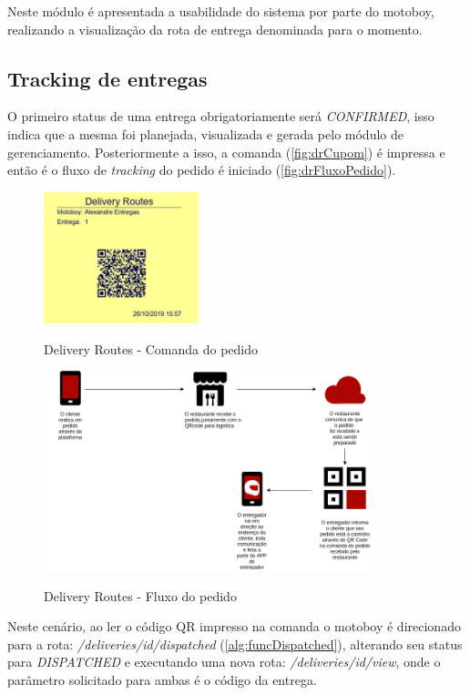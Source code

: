 Neste módulo é apresentada a usabilidade do sistema por parte do motoboy, realizando a visualização da rota de entrega denominada para o momento.

\subsection{Tracking de entregas}
O primeiro status de uma entrega obrigatoriamente será \textit{CONFIRMED}, isso indica que a mesma foi planejada, visualizada e gerada pelo módulo de gerenciamento. Posteriormente a isso, a comanda (\autoref{fig:drCupom}) é impressa e então é o fluxo de \textit{tracking} do pedido é iniciado (\autoref{fig:drFluxoPedido}).

 \begin{figure}[H]
    \centering
    \caption{Delivery Routes - Comanda do pedido}
    \includegraphics[width=0.4\textwidth]{./dados/figuras/fig24}
    \label{fig:drCupom}
\end{figure}

\begin{figure}[H]
    \centering
    \caption{Delivery Routes - Fluxo do pedido}
    \includegraphics[width=0.85\textwidth]{./dados/figuras/fig25}
    \label{fig:drFluxoPedido}
\end{figure}

Neste cenário, ao ler o código QR impresso na comanda o motoboy é direcionado para a rota: \textit{/deliveries/{id}/dispatched} (\autoref{alg:funcDispatched}), alterando seu status para \textit{DISPATCHED} e executando uma nova rota: \textit{/deliveries/{id}/view}, onde o parâmetro solicitado para ambas é o código da entrega.

